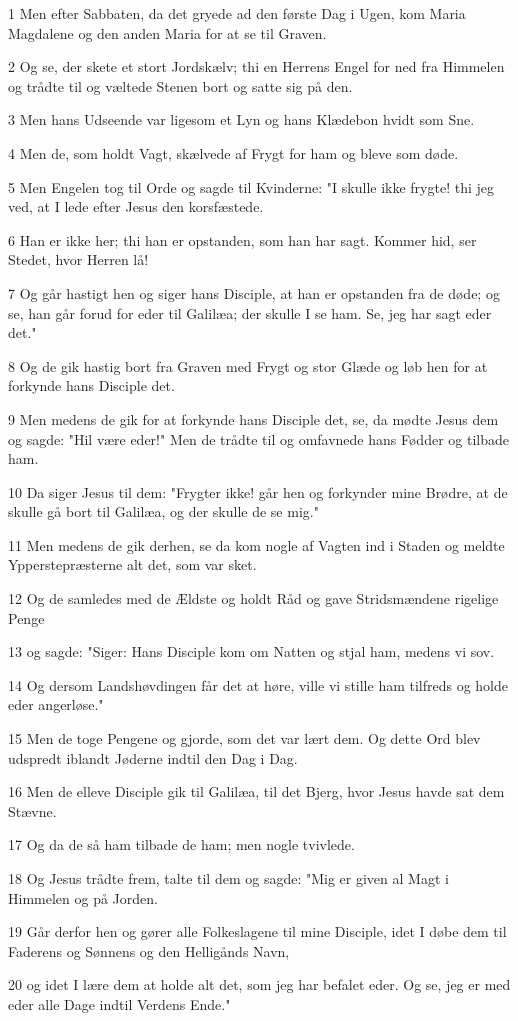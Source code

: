 \par 1 Men efter Sabbaten, da det gryede ad den første Dag i Ugen, kom Maria Magdalene og den anden Maria for at se til Graven.
\par 2 Og se, der skete et stort Jordskælv; thi en Herrens Engel for ned fra Himmelen og trådte til og væltede Stenen bort og satte sig på den.
\par 3 Men hans Udseende var ligesom et Lyn og hans Klædebon hvidt som Sne.
\par 4 Men de, som holdt Vagt, skælvede af Frygt for ham og bleve som døde.
\par 5 Men Engelen tog til Orde og sagde til Kvinderne: "I skulle ikke frygte! thi jeg ved, at I lede efter Jesus den korsfæstede.
\par 6 Han er ikke her; thi han er opstanden, som han har sagt. Kommer hid, ser Stedet, hvor Herren lå!
\par 7 Og går hastigt hen og siger hans Disciple, at han er opstanden fra de døde; og se, han går forud for eder til Galilæa; der skulle I se ham. Se, jeg har sagt eder det."
\par 8 Og de gik hastig bort fra Graven med Frygt og stor Glæde og løb hen for at forkynde hans Disciple det.
\par 9 Men medens de gik for at forkynde hans Disciple det, se, da mødte Jesus dem og sagde: "Hil være eder!" Men de trådte til og omfavnede hans Fødder og tilbade ham.
\par 10 Da siger Jesus til dem: "Frygter ikke! går hen og forkynder mine Brødre, at de skulle gå bort til Galilæa, og der skulle de se mig."
\par 11 Men medens de gik derhen, se da kom nogle af Vagten ind i Staden og meldte Ypperstepræsterne alt det, som var sket.
\par 12 Og de samledes med de Ældste og holdt Råd og gave Stridsmændene rigelige Penge
\par 13 og sagde: "Siger: Hans Disciple kom om Natten og stjal ham, medens vi sov.
\par 14 Og dersom Landshøvdingen får det at høre, ville vi stille ham tilfreds og holde eder angerløse."
\par 15 Men de toge Pengene og gjorde, som det var lært dem. Og dette Ord blev udspredt iblandt Jøderne indtil den Dag i Dag.
\par 16 Men de elleve Disciple gik til Galilæa, til det Bjerg, hvor Jesus havde sat dem Stævne.
\par 17 Og da de så ham tilbade de ham; men nogle tvivlede.
\par 18 Og Jesus trådte frem, talte til dem og sagde: "Mig er given al Magt i Himmelen og på Jorden.
\par 19 Går derfor hen og gører alle Folkeslagene til mine Disciple, idet I døbe dem til Faderens og Sønnens og den Helligånds Navn,
\par 20 og idet I lære dem at holde alt det, som jeg har befalet eder. Og se, jeg er med eder alle Dage indtil Verdens Ende."



